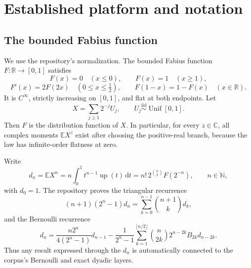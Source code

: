 \documentclass[11pt,oneside]{article}
\numberwithin{equation}{section}
\theoremstyle{definition}
\theoremstyle{remark}
\newcommand{\R}{\mathbb R}
\newcommand{\C}{\mathbb C}
\newcommand{\N}{\mathbb N}
\newcommand{\E}{\mathbb E}
\newcommand{\Up}{\operatorname{up}}
\newcommand{\dd}{\,\mathrm d}
\begin{document}
\section{Established platform and notation}
\label{sec:platform}

\subsection{The bounded Fabius function}
We use the repository's normalization.  The bounded Fabius function
$F:\R\to[0,1]$ satisfies
\begin{equation}
 F(x)=0\quad(x\le0),\qquad F(x)=1\quad(x\ge1),             \label{eq:F-exterior}
\end{equation}
\begin{equation}
 F'(x)=2F(2x)\quad(0\le x\le\tfrac12),\qquad
 F(1-x)=1-F(x)\quad(x\in\R).                              \label{eq:F-basic}
\end{equation}
It is $C^\infty$, strictly increasing on $[0,1]$, and flat at both endpoints.
Let
\begin{equation}
 X=\sum_{j\ge1}2^{-j}U_j,
 \qquad U_j\stackrel{\mathrm{iid}}{\sim}\operatorname{Unif}[0,1]. \label{eq:X-random}
\end{equation}
Then $F$ is the distribution function of $X$.  In particular, for every
$z\in\C$, all complex moments $\E X^z$ exist after choosing the positive-real
branch, because the law has infinite-order flatness at zero.

Write
\begin{equation}
 d_n=\E X^n
     =n\int_0^1t^{n-1}\Up(t)\dd t
     =n!\,2^{\binom n2}F(2^{-n}),\qquad n\in\N,             \label{eq:d-moments}
\end{equation}
with $d_0=1$.  The repository proves the triangular recurrence
\begin{equation}
 (n+1)(2^n-1)d_n=\sum_{k=0}^{n-1}\binom{n+1}{k}d_k,         \label{eq:d-recurrence}
\end{equation}
and the Bernoulli recurrence
\begin{equation}
 d_n=\frac{n2^n}{4(2^n-1)}d_{n-1}
 -\frac1{2^n-1}\sum_{k=1}^{\lfloor n/2\rfloor}
 \binom n{2k}2^{n-2k}B_{2k}d_{n-2k}.                       \label{eq:d-bernoulli}
\end{equation}
Thus any result expressed through the $d_n$ is automatically connected to the
corpus's Bernoulli and exact dyadic layers.
\end{document}
